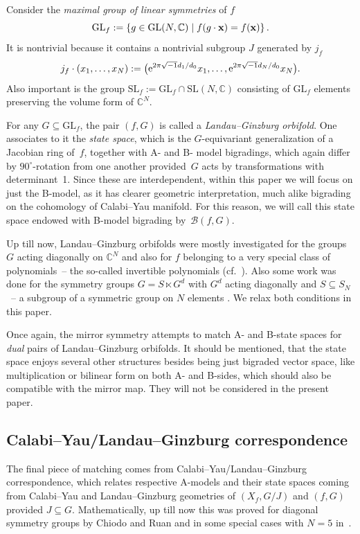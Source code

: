 \documentclass[10pt,a4paper]{amsart}
\numberwithin{equation}{section}
\newcommand{\CC}{{\mathbb{C}}}
\newcommand{\SL}{{\mathrm{SL}}}
\newcommand{\GL}{{\mathrm{GL}}}
\newcommand{\bx}{{\bf x}}
\def\B{{\mathcal B}}
\begin{document}
Consider the \textit{maximal group of linear symmetries} of $f$
\[
	\GL_f := \left\lbrace g \in \GL(N,\CC) \mid f(g \cdot \bx ) = f(\bx) \right\rbrace.
\]
It is nontrivial because it contains a nontrivial subgroup $J$ generated by $j_f$
\[
	j_f \cdot (x_1,\dots,x_N) := \bigl({\rm e}^{2 \pi \sqrt{-1} d_1/d_0} x_1,\dots, {\rm e}^{2 \pi \sqrt{-1} d_N/d_0}x_N\bigr).
\]
Also important is the group $\SL_f := \GL_f \cap \SL(N,\CC)$ consisting of $\GL_f$ elements preserving the volume form of $\CC^N$.

For any $G \subseteq \GL_f$, the pair $(f,G)$ is called a \textit{Landau--Ginzburg orbifold}. One associates to it the \textit{state space}, which is the $G$-equivariant generalization of a Jacobian ring of~$f$, together with A- and B- model bigradings, which again differ by $90^\circ$-rotation from one another provided~$G$ acts by transformations with determinant~1. Since these are interdependent, within this paper we will focus on just the B-model, as it has clearer geometric interpretation, much alike bigrading on the cohomology of Calabi--Yau manifold. For this reason, we will call this state space endowed with B-model bigrading by~$\B(f,G)$.

Up till now, Landau--Ginzburg orbifolds were mostly investigated for the groups $G$ acting diagonally on $\CC^N$ and also for $f$ belonging to a very special class of polynomials~-- the so-called invertible polynomials (cf.\ \cite{BT2,BTW17,BTW16,FJJS,K03,K06,K09}). Also some work was done for the symmetry groups $G = S \ltimes G^d$ with $G^d$ acting diagonally and $S \subseteq S_N$~-- a subgroup of a symmetric group on $N$ elements \cite{BI21,BI22,CJMPW23,EGZ20,EGZ18,I23,MO70,WWP,Y16}.
We relax both conditions in this paper.

Once again, the mirror symmetry attempts to match A- and B-state spaces for {\itshape dual} pairs of Landau--Ginzburg orbifolds. It should be mentioned, that the state space enjoys several other structures besides being just bigraded vector space, like multiplication or bilinear form on both A- and B-sides, which should also be compatible with the mirror map. They will not be considered in the present paper.

\subsection{Calabi--Yau/Landau--Ginzburg correspondence} The final piece of matching comes from Calabi--Yau/Landau--Ginzburg correspondence, which relates respective A-models and their state spaces coming from Calabi--Yau and Landau--Ginzburg geometries of $(X_f,G/J)$ and $(f,G)$ provided $J\subseteq G$.
Mathematically, up till now this was proved for diagonal symmetry groups by Chiodo and Ruan \cite[Theorem 14]{CR11} and in some special cases with $N=5$ in~\cite{Muk}.
\end{document}

